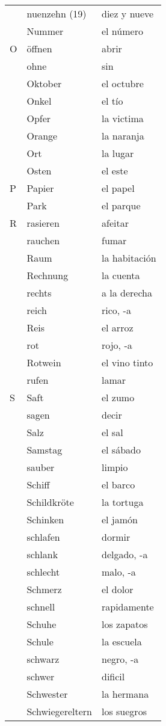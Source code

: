 \documentclass[10pt,spanish]{article}
\begin{document}
\begin{longtable}{p{} p{} | p{}}
& nuenzehn (19) & diez y nueve  \\
& Nummer & el número  \\
O & öffnen & abrir  \\
& ohne & sin  \\
& Oktober & el octubre  \\
& Onkel & el tío  \\
& Opfer & la victima \\
& Orange & la naranja  \\
& Ort & la lugar  \\
& Osten & el este  \\
P & Papier & el papel  \\
& Park & el parque  \\
R & rasieren & afeitar \\
& rauchen & fumar  \\
& Raum & la habitación  \\
& Rechnung & la cuenta  \\
& rechts & a la derecha \\
& reich & rico, -a  \\
& Reis & el arroz  \\
& rot & rojo, -a  \\
& Rotwein & el vino tinto  \\
& rufen & lamar  \\
S & Saft & el zumo  \\
& sagen & decir  \\
& Salz & el sal  \\
& Samstag & el sábado  \\
& sauber & limpio  \\
& Schiff & el barco  \\
& Schildkröte & la tortuga  \\
& Schinken & el jamón \\
& schlafen & dormir  \\
& schlank & delgado, -a \\
& schlecht & malo, -a \\
& Schmerz & el dolor  \\
& schnell & rapidamente  \\
& Schuhe & los zapatos  \\
& Schule & la escuela  \\
& schwarz & negro, -a  \\
& schwer & dificil  \\
& Schwester & la hermana  \\
& Schwiegereltern & los suegros  \\

\end{longtable}
\end{document}
